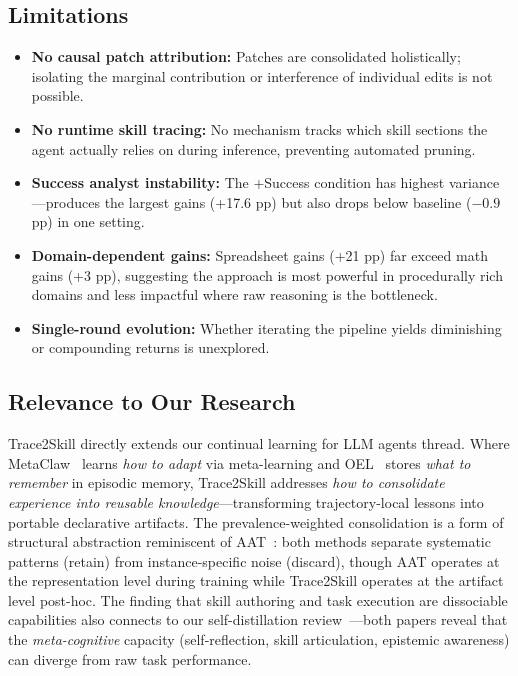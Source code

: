 \documentclass[11pt]{article}
\begin{document}
\subsection{Limitations}

\begin{itemize}
    \item \textbf{No causal patch attribution:} Patches are consolidated holistically; isolating the marginal contribution or interference of individual edits is not possible.
    \item \textbf{No runtime skill tracing:} No mechanism tracks which skill sections the agent actually relies on during inference, preventing automated pruning.
    \item \textbf{Success analyst instability:} The +Success condition has highest variance---produces the largest gains (+17.6 pp) but also drops below baseline ($-0.9$ pp) in one setting.
    \item \textbf{Domain-dependent gains:} Spreadsheet gains (+21 pp) far exceed math gains (+3 pp), suggesting the approach is most powerful in procedurally rich domains and less impactful where raw reasoning is the bottleneck.
    \item \textbf{Single-round evolution:} Whether iterating the pipeline yields diminishing or compounding returns is unexplored.
\end{itemize}

\subsection{Relevance to Our Research}

Trace2Skill directly extends our continual learning for LLM agents thread. Where MetaClaw~\cite{metaclaw} learns \textit{how to adapt} via meta-learning and OEL~\cite{oel} stores \textit{what to remember} in episodic memory, Trace2Skill addresses \textit{how to consolidate experience into reusable knowledge}---transforming trajectory-local lessons into portable declarative artifacts. The prevalence-weighted consolidation is a form of structural abstraction reminiscent of AAT~\cite{aat}: both methods separate systematic patterns (retain) from instance-specific noise (discard), though AAT operates at the representation level during training while Trace2Skill operates at the artifact level post-hoc. The finding that skill authoring and task execution are dissociable capabilities also connects to our self-distillation review~\cite{selfdistill}---both papers reveal that the \textit{meta-cognitive} capacity (self-reflection, skill articulation, epistemic awareness) can diverge from raw task performance.
\end{document}
